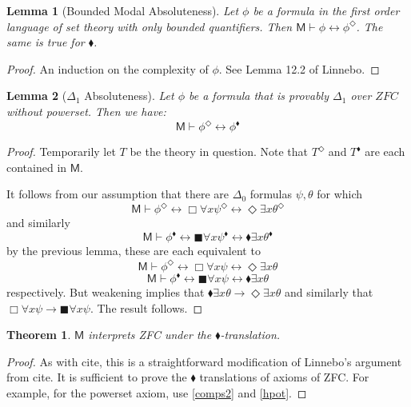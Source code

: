 \documentclass{article}
\newcommand\D{\blacklozenge}
\newcommand\B{\blacksquare}
\newtheorem{lemma}{Lemma}
\newtheorem{theorem}{Theorem}
\begin{document}
\begin{lemma}[Bounded Modal Absoluteness]\label{BMA}
    Let $\phi$ be 
    a formula in the first order language of set theory
    with only bounded quantifiers. Then
    $\mathsf{M} \vdash \phi \leftrightarrow \phi^\Diamond$.
    The same is true for $\D$.
\end{lemma}
\begin{proof}
    An induction on the complexity of $\phi$. See Lemma 12.2 of Linnebo.
\end{proof}
\begin{lemma}[$\Delta_1$ Absoluteness]\label{DA}
    Let $\phi$ be a formula that is provably $\Delta_1$ over $ZFC$ without 
    powerset. Then we have: 
    \[\mathsf{M} \vdash \phi^{\Diamond} \leftrightarrow \phi^{\D}\]
\end{lemma}
\begin{proof}
    Temporarily let $T$ be the theory in question.
    Note that $T^\Diamond$ and $T^{\D}$ are each contained in $\mathsf{M}$.

    It follows from our assumption that there are $\Delta_0$ formulas $\psi, \theta$
    for which
    \[\mathsf{M} \vdash \phi^\Diamond \leftrightarrow 
    \Box \forall x \psi^\Diamond \leftrightarrow 
    \Diamond \exists x \theta^\Diamond \] 
    and similarly
    \[\mathsf{M} \vdash \phi^{\D} \leftrightarrow 
    \B \forall x \psi^{\D} \leftrightarrow 
    \D \exists x \theta^{\D} \] 
    by the previous lemma, these are each equivalent to 
    \[\mathsf{M} \vdash \phi^\Diamond \leftrightarrow 
    \Box \forall x \psi \leftrightarrow 
    \Diamond \exists x \theta \] 
    \[\mathsf{M} \vdash \phi^{\D} \leftrightarrow 
    \B \forall x \psi \leftrightarrow 
    \D \exists x \theta \] 
    respectively. But weakening implies that 
    $\D \exists x \theta \rightarrow \Diamond \exists x \theta$
    and similarly that $\Box \forall x \psi \rightarrow \B \forall x \psi$.
    The result follows.
\end{proof}

\begin{theorem}
    $\mathsf{M}$ interprets ZFC under the $\D$-translation.
\end{theorem}
\begin{proof}
    As with cite, this is a straightforward modification of 
    Linnebo's argument from cite. It is sufficient to prove the $\D$ 
    translations of axioms of ZFC. For example, for the powerset 
    axiom, use \eqref{comps2} and \eqref{hpot}.
\end{proof}
\end{document}
